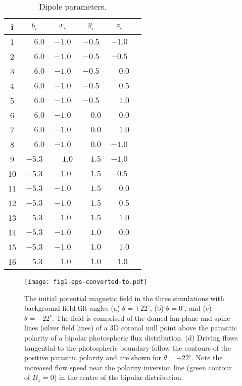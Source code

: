 \documentclass[twocolumn]{aastex6}
\begin{document}
\begin{table}[ht]
\centering %
\caption{Dipole parameters.} %
\begin{tabular}{c c c c c c} %
\hline\hline %
i & $b_{i}$ & $x_{i}$ & $y_{i}$ & $z_{i}$ \\ [0.5ex] %
\hline %
1 & $\phantom{-}6.0$ & $-1.0$ & $-0.5$ & $-1.0$ \\ %
2 & $\phantom{-}6.0$ & $-1.0$ & $-0.5$ & $-0.5$ \\
3 & $\phantom{-}6.0$ & $-1.0$ & $-0.5$ & $\phantom{-}0.0$ \\
4 & $\phantom{-}6.0$ & $-1.0$ & $-0.5$ & $\phantom{-}0.5$ \\
5 & $\phantom{-}6.0$ & $-1.0$ & $-0.5$ & $\phantom{-}1.0$ \\
6 & $\phantom{-}6.0$ & $-1.0$ & $\phantom{-}0.0$ & $\phantom{-}0.0$ \\
7 & $\phantom{-}6.0$ & $-1.0$ & $\phantom{-}0.0$ & $\phantom{-}1.0$ \\
8 & $\phantom{-}6.0$ & $-1.0$ & $\phantom{-}0.0$ & $-1.0$ \\
9 & $-5.3$ & $\phantom{-}1.0$ & $\phantom{-}1.5$ & $-1.0$ \\
10 & $-5.3$ & $-1.0$ & $\phantom{-}1.5$ & $-0.5$ \\
11 & $-5.3$ & $-1.0$ & $\phantom{-}1.5$ & $\phantom{-}0.0$ \\
12 & $-5.3$ & $-1.0$ & $\phantom{-}1.5$ & $\phantom{-}0.5$ \\
13 & $-5.3$ & $-1.0$ & $\phantom{-}1.5$ & $\phantom{-}1.0$ \\
14 & $-5.3$ & $-1.0$ & $\phantom{-}1.0$ & $\phantom{-}0.0$ \\
15 & $-5.3$ & $-1.0$ & $\phantom{-}1.0$ & $\phantom{-}1.0$ \\
16 & $-5.3$ & $-1.0$ & $\phantom{-}1.0$ & $-1.0$ \\
\hline %
\end{tabular}
\label{table:bipoles} 
\end{table}

\begin{figure*}
\centering
\texttt{[image: fig1-eps-converted-to.pdf]}
\caption{The initial potential magnetic field in the three simulations with background-field tilt angles (a) $\theta = +22^\circ$, (b) $\theta = 0^\circ$, and (c) $\theta = -22^\circ$. The field is comprised of the domed fan plane and spine lines (silver field lines) of a 3D coronal null point above the parasitic polarity of a bipolar photospheric flux distribution. (d) Driving flows tangential to the photospheric boundary follow the contours of the positive parasitic polarity and are shown for $\theta = +22^\circ$. Note the increased flow speed near the polarity inversion line (green contour of $B_x = 0$) in the centre of the bipolar distribution.}
\label{fig:setup}
\end{figure*}
\end{document}

